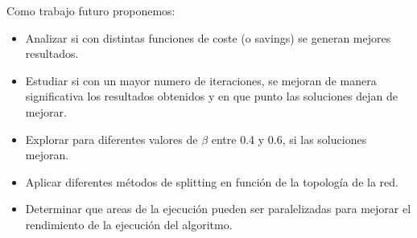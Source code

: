 \documentclass[11pt]{article} %
\begin{document}
\begin{enumerate}
Como trabajo futuro proponemos: 

\begin{itemize}
\item Analizar si con distintas funciones de coste (o savings) se generan mejores resultados.
\item Estudiar si con un mayor numero de iteraciones, se mejoran de manera significativa los resultados obtenidos y en que punto las soluciones dejan de mejorar.
\item Explorar para diferentes valores de $\beta$ entre 0.4 y 0.6, si las soluciones mejoran.
\item Aplicar diferentes métodos de splitting en función de la topología de la red.
\item Determinar que areas de la ejecución pueden ser paralelizadas para mejorar el rendimiento de la ejecución del algoritmo.
\end{itemize}

 \end{enumerate}

\pagestyle{empty}
\begin{landscape}

\end{landscape}
\pagestyle{plain}
\end{document}
